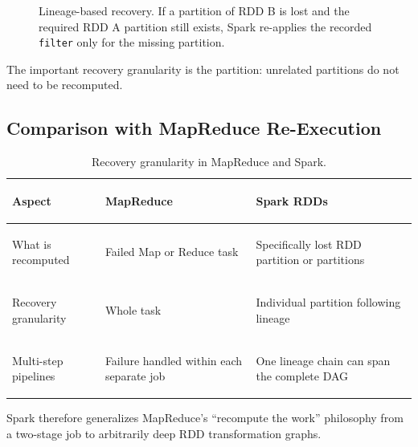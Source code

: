 \documentclass[11pt,a4paper,oneside]{book}
\begin{document}
\begin{figure}[htbp]
\centering
{}
\caption{Lineage-based recovery. If a partition of RDD B is lost and the required RDD A partition still exists, Spark re-applies the recorded \texttt{filter} only for the missing partition.}
\label{fig:lineage-recompute}
\end{figure}

The important recovery granularity is the partition: unrelated partitions do not need to be recomputed.

\subsection{Comparison with MapReduce Re-Execution}

\begin{table}[htbp]
\centering
\caption{Recovery granularity in MapReduce and Spark.}
\label{tab:mapreduce-spark-recovery}
\begin{tabularx}{\textwidth}{>{\bfseries\raggedright\arraybackslash}p{3.4cm} Y Y}
\toprule
{}
Aspect & MapReduce & Spark RDDs \\
\midrule
What is recomputed & Failed Map or Reduce task & Specifically lost RDD partition or partitions \\
Recovery granularity & Whole task & Individual partition following lineage \\
Multi-step pipelines & Failure handled within each separate job & One lineage chain can span the complete DAG \\
\bottomrule
\end{tabularx}
\end{table}

Spark therefore generalizes MapReduce's ``recompute the work'' philosophy from a two-stage job to arbitrarily deep RDD transformation graphs.
\end{document}
